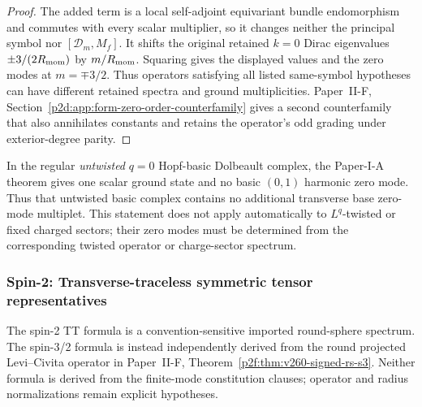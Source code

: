 \documentclass[12pt,a4paper]{article}
\begin{document}
\begin{proof}
The added term is a local self-adjoint equivariant bundle endomorphism and
commutes with every scalar multiplier, so it changes neither the principal
symbol nor \([\mathscr D_m,M_f]\).  It shifts the original retained
\(k=0\) Dirac eigenvalues \(\pm3/(2R_{\mathrm{mom}})\) by \(m/R_{\mathrm{mom}}\).
Squaring gives the displayed
values and the zero modes at \(m=\mp3/2\).  Thus operators satisfying all
listed same-symbol hypotheses can have different retained spectra and ground
multiplicities.  Paper~II-F, Section~\ref{p2d:app:form-zero-order-counterfamily} gives a
second counterfamily that also annihilates constants and retains the operator's
odd grading under exterior-degree parity.
\end{proof}

\begin{remark}
\label{p2:rem:basic-hopf-zero-mode-accounting}
In the regular \emph{untwisted} \(q=0\) Hopf-basic Dolbeault complex, the
Paper-I-A theorem gives one scalar ground state and no basic \((0,1)\) harmonic
zero mode.  Thus that untwisted basic complex contains no additional
transverse base zero-mode multiplet.  This statement does not apply
automatically to \(L^q\)-twisted or fixed charged sectors; their zero modes
must be determined from the corresponding twisted operator or
charge-sector spectrum.
\end{remark}


\subsubsection{Spin-2: Transverse-traceless symmetric tensor representatives}

The spin-2 TT formula is a convention-sensitive imported round-sphere spectrum. The spin-3/2 formula is instead independently derived from the round projected Levi--Civita operator in Paper~II-F, Theorem~\ref{p2f:thm:v260-signed-rs-s3}. Neither formula is derived from the finite-mode constitution clauses; operator and radius normalizations remain explicit hypotheses.
\end{document}
